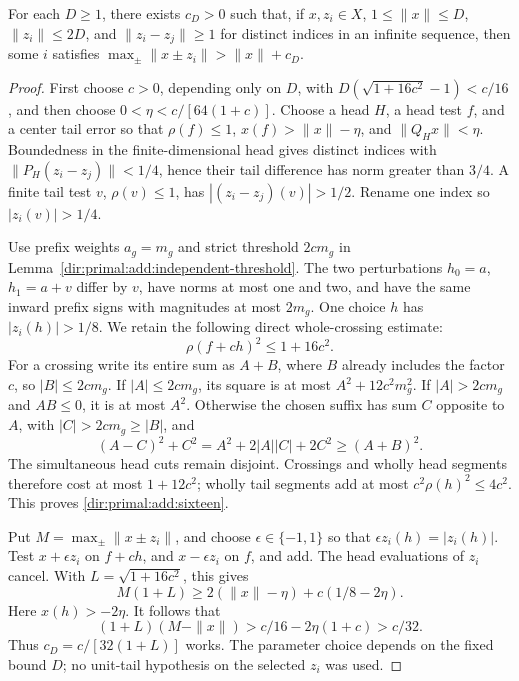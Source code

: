 \begin{proposition}\label{dir:primal:add:separated}
For each \(D\ge1\), there exists \(c_D>0\) such that, if
\(x,z_i\in X\), \(1\le\|x\|\le D\), \(\|z_i\|\le2D\), and
\(\|z_i-z_j\|\ge1\) for distinct indices in an infinite sequence, then
some \(i\) satisfies \(\max_{\pm}\|x\pm z_i\|>\|x\|+c_D\).
\end{proposition}
\begin{proof}
First choose \(c>0\), depending only on \(D\), with
\(D(\sqrt{1+16c^2}-1)<c/16\), and then choose
\(0<\eta<c/[64(1+c)]\).
Choose a head \(H\), a head test \(f\), and a center tail error so that
\(\rho(f)\le1\), \(x(f)>\|x\|-\eta\), and \(\|Q_Hx\|<\eta\).
Boundedness in the finite-dimensional head gives distinct indices with
\(\|P_H(z_i-z_j)\|<1/4\), hence their tail difference has norm greater
than \(3/4\). A finite tail test \(v\), \(\rho(v)\le1\), has
\(|(z_i-z_j)(v)|>1/2\). Rename one index so \(|z_i(v)|>1/4\).

Use prefix weights \(a_g=m_g\) and strict threshold \(2c m_g\) in
Lemma~\ref{dir:primal:add:independent-threshold}. The two perturbations
\(h_0=a\), \(h_1=a+v\) differ by \(v\), have norms at most one and two,
and have the same inward prefix signs with magnitudes at most \(2m_g\).
One choice \(h\) has \(|z_i(h)|>1/8\).
We retain the following direct whole-crossing estimate:
\begin{equation}\label{dir:primal:add:sixteen}
 \rho(f+ch)^2\le1+16c^2.
\end{equation}
For a crossing write its entire sum as \(A+B\), where \(B\) already
includes the factor \(c\), so \(|B|\le2cm_g\).
If \(|A|\le2cm_g\), its square is at most \(A^2+12c^2m_g^2\).
If \(|A|>2cm_g\) and \(AB\le0\), it is at most \(A^2\).
Otherwise the chosen suffix has sum \(C\) opposite to \(A\), with
\(|C|>2cm_g\ge|B|\), and
\[
 (A-C)^2+C^2
 =A^2+2|A||C|+2C^2\ge(A+B)^2.
\]
The simultaneous head cuts remain disjoint. Crossings and wholly head
segments therefore cost at most \(1+12c^2\); wholly tail segments add
at most \(c^2\rho(h)^2\le4c^2\). This proves
\eqref{dir:primal:add:sixteen}.

Put \(M=\max_{\pm}\|x\pm z_i\|\), and choose \(\epsilon\in\{-1,1\}\)
so that \(\epsilon z_i(h)=|z_i(h)|\). Test \(x+\epsilon z_i\) on
\(f+ch\), and \(x-\epsilon z_i\) on \(f\), and add. The head evaluations
of \(z_i\) cancel. With \(L=\sqrt{1+16c^2}\), this gives
\begin{equation}\label{dir:primal:add:two-test}
 M(1+L)\ge2(\|x\|-\eta)+c(1/8-2\eta).
\end{equation}
Here \(x(h)>-2\eta\). It follows that
\[
 (1+L)(M-\|x\|)
 >c/16-2\eta(1+c)>c/32.
\]
Thus \(c_D=c/[32(1+L)]\) works. The parameter choice depends on the fixed
bound \(D\); no unit-tail hypothesis on the selected \(z_i\) was used.
\end{proof}
